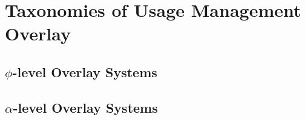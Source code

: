 \section{Taxonomies of Usage Management Overlay}

\subsection{$\phi$-level Overlay Systems}

\subsection{$\alpha$-level Overlay Systems}